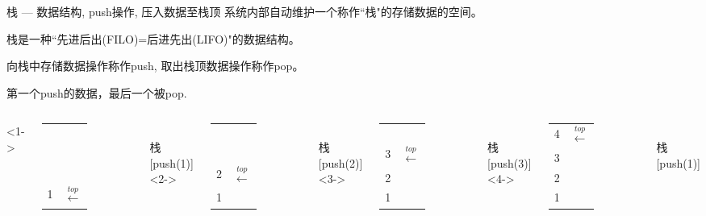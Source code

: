 \begin{frame}{栈 --- 数据结构, push操作, 压入数据至栈顶}
系统内部自动维护一个称作``栈"的存储数据的空间。

栈是一种``先进后出(FILO)=后进先出(LIFO)"的数据结构。

向栈中存储数据操作称作push, 取出栈顶数据操作称作pop。

第一个push的数据，最后一个被pop.
\begin{columns}[T]
	<1->
	\begin{tabular}{|c|l}
		\cline{1-1}
		~&\\
		\cline{1-1}
		~&\\
		\cline{1-1}
		~&\\
		\cline{1-1} 
		\cellcolor{yellow}1&$\xleftarrow{top}$ \\ 
		\cline{1-1} 
	\end{tabular}\\ 
	栈[push(1)]
	<2->
	\begin{tabular}{|c|l}
		\cline{1-1}
		~&\\
		\cline{1-1}
		~&\\
		\cline{1-1} 
		\cellcolor{yellow}2 &$\xleftarrow{top}$ \\ 
		\cline{1-1} 
		1 &\\ 
		\cline{1-1}
	\end{tabular}\\ 
	栈[push(2)]
	<3->
	\begin{tabular}{|c|l}
		\cline{1-1}
		~&\\
		\cline{1-1}
		\cellcolor{yellow}3 &$\xleftarrow{top}$ \\ 
		\cline{1-1}
		2 &\\ 
		\cline{1-1}
		1 &\\ 
		\cline{1-1}
	\end{tabular}\\ 
	栈[push(3)]
	<4->
	\begin{tabular}{|c|l}
		\cline{1-1} 
		\cellcolor{yellow}4 &$\xleftarrow{top}$ \\ 
		\cline{1-1}
		3 &\\ 
		\cline{1-1}
		2 &\\ 
		\cline{1-1}
		1 &\\ 
		\cline{1-1}
	\end{tabular}\\ 
	栈[push(1)]
\end{columns}
\end{frame}

